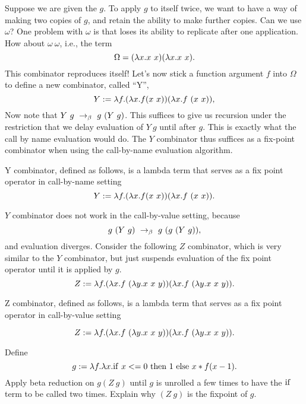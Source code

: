 \begin{gram}[$Y$ Combinator]
\label{grm:lcc:recursion::y-combinator}
Suppose we are given the
$g$.  To apply $g$ to itself twice, we want to have a way of
making two copies of $g$, and retain the ability to make further
copies. Can we use $\omega$? 
%
One problem with $\omega$ is that loses
its ability to replicate after one application.  How about
$\omega~\omega$, i.e., the term 
\[
\Omega = (\lambda x. x~x) (\lambda x. x~x).  
\]
This combinator reproduces itself!  
%
Let's now stick a
function argument $f$ into $\Omega$ to define a new combinator, called ``Y'',
\[
Y := \lambda f.  (\lambda x. f (x~  x)) (\lambda x. f~ (x~ x)),
\]
%
Now note that $Y~ g ~\rightarrow_{\beta}~ g~ (Y~ g)$. 
%
This suffices to give us
recursion under the restriction that we delay evaluation of $Y~ g$
until after $g$.  This is exactly what the call by name evaluation
would do.  The $Y$ combinator thus suffices as a fix-point
combinator when using the call-by-name evaluation algorithm.
\end{gram}

\begin{definition}[$Y$ Combinator]
\label{def:lcc:recursion::y-combinator}
Y combinator, defined as follows, is a lambda term that serves as a fix point operator in call-by-name setting
\[
Y := \lambda f.  (\lambda x. f (x~  x)) (\lambda x. f~ (x~ x)).
\]
\end{definition}

\begin{gram}[$Z$ Combinator]
\label{grm:lcc:recursion::z-combinator}
$Y$ combinator does not work in the call-by-value setting, because
\[
g~ (Y~ g) ~\rightarrow_{\beta}~ g~ ( g~ (Y~ g)),
\]
and  evaluation diverges.  
%
Consider the following $Z$ combinator, which is very similar
to the $Y$ combinator, but just suspends evaluation of the fix point
operator until it is applied by $g$.  
%
\[
Z :=  \lambda f. (\lambda x. f~ (\lambda y. x~ x~ y)) (\lambda x. f~ (\lambda y. x~ x~ y)).
\]
\end{gram}

\begin{definition}[$Z$ Combinator]
\label{def:lcc:recursion::z-combinator}
Z combinator, defined as follows, is a lambda term that serves as a fix point operator in call-by-value setting

\[
Z :=  \lambda f. (\lambda x. f~ (\lambda y. x~ x~ y)) (\lambda x. f~ (\lambda y. x~ x~ y)).
\]
\end{definition}

\begin{exercise}
\label{xrcs:lcc:recursion::z-combinator}
Define 
\[
g := \lambda f. \lambda x.  \mathrm{if}~x <= 0~\mathrm{then}~1~\mathrm{else}~x*f
      (x-1).
\]
%
Apply beta reduction on $g (Z~ g)$ until $g$ is unrolled a few times
to have the $\mathrm{if}$ term to be called two times.  Explain why $(Z~ g)$
is the fixpoint of $g$.  
\end{exercise}


